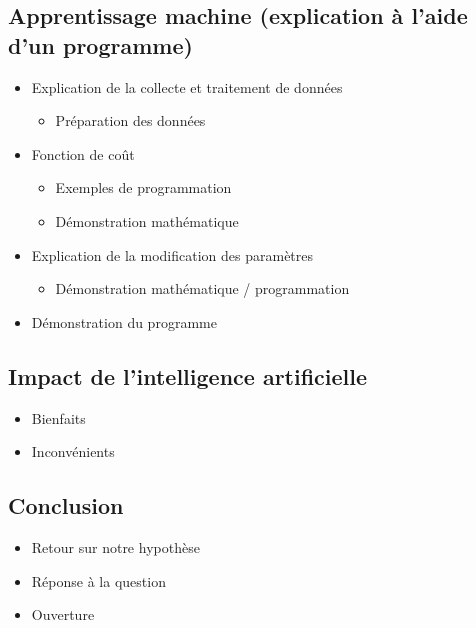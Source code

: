 \documentclass[letterpaper,10pt,french]{sphinxmanual}
\begin{document}
\subsection{Apprentissage machine (explication à l’aide d’un programme)}
\label{\detokenize{plan:apprentissage-machine-explication-a-l-aide-d-un-programme}}\begin{itemize}
\item {} 
Explication de la collecte et traitement de données
\begin{itemize}
\item {} 
Préparation des données

\end{itemize}

\item {} 
Fonction de coût
\begin{itemize}
\item {} 
Exemples de programmation

\item {} 
Démonstration mathématique

\end{itemize}

\item {} 
Explication de la modification des paramètres
\begin{itemize}
\item {} 
Démonstration mathématique / programmation

\end{itemize}

\item {} 
Démonstration du programme

\end{itemize}


\subsection{Impact de l’intelligence artificielle}
\label{\detokenize{plan:impact-de-l-intelligence-artificielle}}\begin{itemize}
\item {} 
Bienfaits

\item {} 
Inconvénients

\end{itemize}


\subsection{Conclusion}
\label{\detokenize{plan:conclusion}}\begin{itemize}
\item {} 
Retour sur notre hypothèse

\item {} 
Réponse à la question

\item {} 
Ouverture

\end{itemize}
\end{document}
